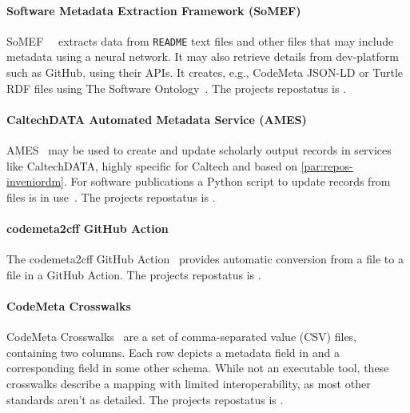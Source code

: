 \documentclass[11pt,a4paper]{scrartcl}
\newcommand{\fn}[1]{\texttt{#1}}
\begin{document}
\paragraph{Software Metadata Extraction Framework (SoMEF)}\label{par:tooling-somef}
SoMEF~\cite{sw:SoMEF}~\cite{SoMEF} extracts data from \fn{README} text files and
other files that may include metadata using a neural network. It may also retrieve details from \gls{dev-platform}
such as GitHub, using their APIs. It creates, e.g., CodeMeta JSON-LD or Turtle RDF files using 
The Software Ontology~\cite{SoftDescOnto}. The projects \gls{repostatus} is .

\paragraph{CaltechDATA Automated Metadata Service (AMES)}\label{par:tooling-ames}
AMES~\cite{sw:AMES} may be used to create and update scholarly output records in services like
CaltechDATA, highly specific for Caltech and based on \ref{par:repos-inveniordm}. For software publications
a Python script to update  records from 
files is in use~\cite{ASCL-CaltechAMES}. The projects \gls{repostatus} is .

\paragraph{codemeta2cff GitHub Action}\label{par:tooling-codemeta2cff}
The codemeta2cff GitHub Action~\cite{sw:codemeta2cff} provides automatic conversion from a
 file to a  file in a GitHub Action.
The projects \gls{repostatus} is .

\paragraph{CodeMeta Crosswalks}\label{par:tooling-crosswalks}
CodeMeta Crosswalks~\cite{sw:codemeta-crosswalks} are a set of comma-separated value (CSV) files, containing
two columns. Each row depicts a metadata field in  and a
corresponding field in some other schema. 
While not an executable tool, these crosswalks describe a mapping with limited interoperability, as most
other standards aren’t as detailed.
The projects \gls{repostatus} is .
\end{document}
